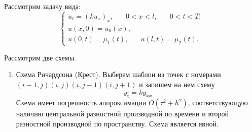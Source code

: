 \documentclass[12pt, a4paper]{article}
\newcommand{\pon}[1]{\mathop {#1}\limits^ \circ}
\begin{document}
	Рассмотрим задачу вида:
	\[
	\begin{cases}
		u_t = (ku_x)_x, \phantom{xxx} 0<x<l, \phantom{xxx} 0<t<T; \\
		u(x,0) = u_0(x), \\
		u(0,t)=\mu_1(t), \phantom{xxx} u(l,t)=\mu_2(t).
	\end{cases}
	\]
	
	Рассмотрим две схемы.
	\begin{enumerate}
		\item Схема Ричардсона (Крест).
		Выберем шаблон из точек с номерами $(i-1,j)(i, j)(i, j-1)(i, j+1)$ и запишем на нем схему
		\begin{equation*}
			y_{\pon{t}} = k y_{\bar{x}x}
		\end{equation*}
		Схема имеет погрешность аппроксимации $O(\tau^2 + h^2)$, соответствующую наличию центральной разностной производной по времени и второй разностной производной по пространству. Схема является явной. 
		

\end{enumerate}
\end{document}
